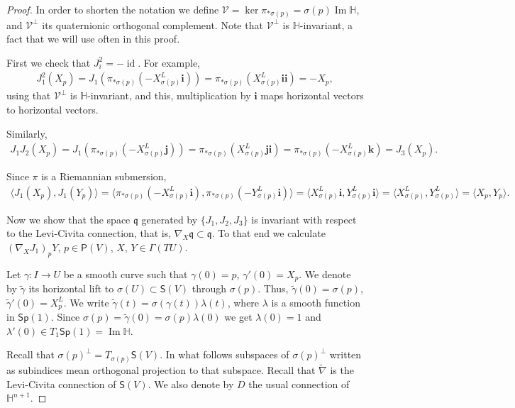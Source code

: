 \documentclass[12pt, a4paper]{amsart}
\newcommand{\id}{\operatorname{id}}
\newcommand{\g}{\mathfrak}
\renewcommand{\H}{\mathbb{H}}
\renewcommand{\Im}{\operatorname{Im}}
\newcommand{\Sp}{\mathsf{Sp}}
\theoremstyle{remark}
\begin{document}
\begin{proof}
In order to shorten the notation we define $\mathcal{V}=\ker\pi_{*\sigma(p)}=\sigma(p)\Im\H$, and $\mathcal{V}^\perp$ its quaternionic orthogonal complement.
Note that ${\mathcal{V}}^\perp$ is $\H$-invariant, a fact that we will use often in this proof.

First we check that $J_i^2=-\id$.
For example, 
\[
\begin{aligned}
J_1^2(X_p)
=J_1(\pi_{*\sigma(p)}(-X_{\sigma(p)}^L\mathbf{i}))
=\pi_{*\sigma(p)}(X_{\sigma(p)}^L\mathbf{i}\mathbf{i})
=-X_p,
\end{aligned}
\]
using that $\mathcal{V}^\perp$ is $\H$-invariant, and this, multiplication by $\mathbf{i}$ maps horizontal vectors to horizontal vectors.

Similarly,
\[
\begin{aligned}
J_1 J_2(X_p)
=J_1(\pi_{*\sigma(p)}(-X_{\sigma(p)}^L\mathbf{j}))
=\pi_{*\sigma(p)}(X_{\sigma(p)}^L\mathbf{j}\mathbf{i})
=\pi_{*\sigma(p)}(-X_{\sigma(p)}^L\mathbf{k})
=J_3(X_p).
\end{aligned}
\]

Since $\pi$ is a Riemannian submersion,
\[
\begin{aligned}
\langle J_1(X_p),J_1(Y_p)\rangle
=\langle \pi_{*\sigma(p)}(-X_{\sigma(p)}^L\mathbf{i}),\pi_{*\sigma(p)}(-Y_{\sigma(p)}^L\mathbf{i})\rangle
=\langle X_{\sigma(p)}^L\mathbf{i}, Y_{\sigma(p)}^L\mathbf{i}\rangle
=\langle X_{\sigma(p)}^L, Y_{\sigma(p)}^L\rangle
=\langle X_p,Y_p\rangle.
\end{aligned}
\]

Now we show that the space $\g{q}$ generated by $\{J_1,J_2,J_3\}$ is invariant with respect to the Levi-Civita connection, that is, $\nabla_X\g{q}\subset\g{q}$.
To that end we calculate $(\nabla_X J_1)_p Y$, $p\in \mathsf{P}(V)$, $X$, $Y\in\Gamma(TU)$.

Let $\gamma\colon I\to U$ be a smooth curve such that $\gamma(0)=p$, $\gamma'(0)=X_p$.
We denote by $\tilde{\gamma}$ its horizontal lift to $\sigma(U)\subset\mathsf{S}(V)$ through $\sigma(p)$.
Thus, $\tilde{\gamma}(0)=\sigma(p)$, $\tilde{\gamma}'(0)=X_p^L$.
We write $\tilde{\gamma}(t)=\sigma(\gamma(t))\lambda(t)$, where $\lambda$ is a smooth function in $\Sp(1)$.
Since $\sigma(p)=\tilde{\gamma}(0)=\sigma(p)\lambda(0)$ we get $\lambda(0)=1$ and $\lambda'(0)\in T_1\Sp(1)=\Im\H$.

Recall that $\sigma(p)^\perp=T_{\sigma(p)}\mathsf{S}(V)$. In what follows subspaces of $\sigma(p)^\perp$ written as subindices mean orthogonal projection to that subspace.
Recall that $\tilde{\nabla}$ is the Levi-Civita connection of $\mathsf{S}(V)$.
We also denote by $D$ the usual connection of $\H^{n+1}$.


\end{proof}
\end{document}
